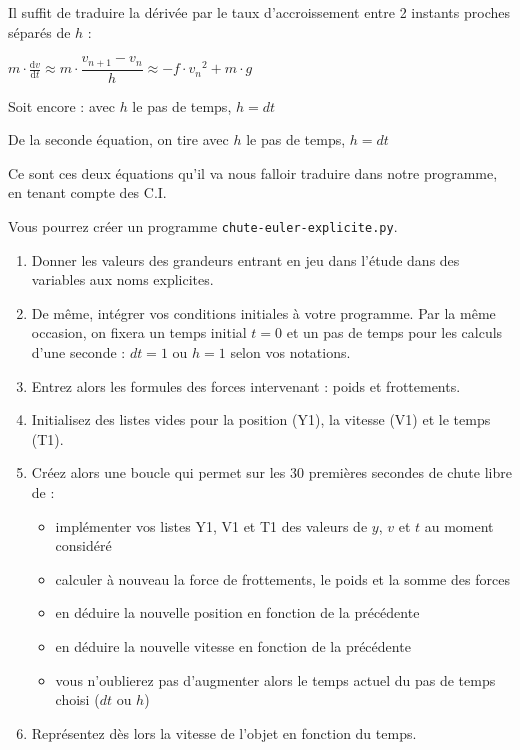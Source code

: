 \documentclass[11pt]{article}
\begin{document}
Il suffit de traduire la dérivée par le taux d'accroissement entre 2 instants proches séparés de $h$ : 

$m\cdot \frac{\text{d}{v}}{\text{d}t} \approx m\cdot \dfrac{v_{n+1} - v_n}{h} \approx -f\cdot {v_n}^2+m\cdot{g}$



Soit encore :  avec $h$ le pas de temps, $h = dt$


De la seconde équation, on tire  avec $h$ le pas de temps, $h = dt$



Ce sont ces deux équations qu'il va nous falloir traduire dans notre programme, en tenant compte des C.I.


\smallskip

Vous pourrez créer un programme \texttt{chute-euler-explicite.py}.

\smallskip


\begin{enumerate}
 \item Donner les valeurs des grandeurs entrant en jeu dans l'étude dans des variables aux noms explicites.
 \item De même, intégrer vos conditions initiales à votre programme. Par la même occasion, on fixera un temps initial $t=0$ et un pas de temps pour les calculs d'une seconde : $dt = 1$ ou $h = 1$ selon vos notations.
 \item Entrez alors les formules des forces intervenant : poids et frottements.
 \item Initialisez des listes vides pour la position (Y1), la vitesse (V1) et le temps (T1).
 \item Créez alors une boucle qui permet sur les 30 premières secondes de chute libre de : 
 \begin{itemize}
  \item implémenter vos listes Y1, V1 et T1 des valeurs de $y$, $v$ et $t$ au moment considéré
  \item calculer à nouveau la force de frottements, le poids et la somme des forces
  \item en déduire la nouvelle position en fonction de la précédente
  \item en déduire la nouvelle vitesse en fonction de la précédente
  \item vous n'oublierez pas d'augmenter alors le temps actuel du pas de temps choisi ($dt$ ou $h$)
 \end{itemize}
\item Représentez dès lors la vitesse de l'objet en fonction du temps.
\end{enumerate}
\end{document}
